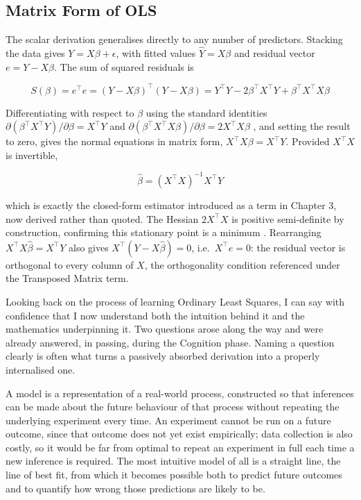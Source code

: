 \subsection*{Matrix Form of OLS}
The scalar derivation generalises directly to any number of predictors. Stacking the data gives $Y = X\beta+\epsilon$, with fitted values $\hat Y = X\beta$ and residual vector $e=Y-X\beta$. The sum of squared residuals is
\begin{mathbox}
\[
S(\beta) = e^\top e = (Y-X\beta)^\top(Y-X\beta) = Y^\top Y - 2\beta^\top X^\top Y + \beta^\top X^\top X \beta
\]
\end{mathbox}
Differentiating with respect to $\beta$ using the standard identities $\partial(\beta^\top X^\top Y)/\partial\beta = X^\top Y$ and $\partial(\beta^\top X^\top X\beta)/\partial\beta = 2X^\top X\beta$ \citep{casella2002}, and setting the result to zero, gives the normal equations in matrix form, $X^\top X\beta = X^\top Y$. Provided $X^\top X$ is invertible,
\begin{mathbox}
\[
\hat\beta = (X^\top X)^{-1}X^\top Y
\]
\end{mathbox}
which is exactly the closed-form estimator introduced as a term in Chapter 3, now derived rather than quoted. The Hessian $2X^\top X$ is positive semi-definite by construction, confirming this stationary point is a minimum \citep{dobson2018}. Rearranging $X^\top X\hat\beta = X^\top Y$ also gives $X^\top(Y-X\hat\beta)=0$, i.e.\ $X^\top e = 0$: the residual vector is orthogonal to every column of $X$, the orthogonality condition referenced under the Transposed Matrix term.

\Reflection

Looking back on the process of learning Ordinary Least Squares, I can say with confidence that I now understand both the intuition behind it and the mathematics underpinning it. Two questions arose along the way and were already answered, in passing, during the Cognition phase. Naming a question clearly is often what turns a passively absorbed derivation into a properly internalised one.

\begin{questionbox}
A model is a representation of a real-world process, constructed so that inferences can be made about the future behaviour of that process without repeating the underlying experiment every time. An experiment cannot be run on a future outcome, since that outcome does not yet exist empirically; data collection is also costly, so it would be far from optimal to repeat an experiment in full each time a new inference is required. The most intuitive model of all is a straight line, the line of best fit, from which it becomes possible both to predict future outcomes and to quantify how wrong those predictions are likely to be.
\end{questionbox}

